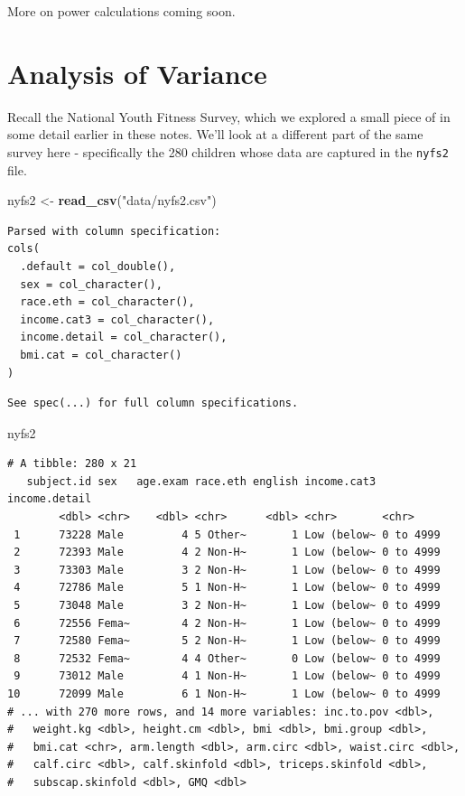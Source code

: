\documentclass[
]{book}
\newenvironment{Shaded}{\begin{snugshade}}{\end{snugshade}}
\newcommand{\KeywordTok}[1]{\textcolor[rgb]{0.13,0.29,0.53}{\textbf{#1}}}
\newcommand{\NormalTok}[1]{#1}
\newcommand{\StringTok}[1]{\textcolor[rgb]{0.31,0.60,0.02}{#1}}
\begin{document}
More on power calculations coming soon.

\hypertarget{analysis-of-variance}{%
\chapter{Analysis of Variance}\label{analysis-of-variance}}

Recall the National Youth Fitness Survey, which we explored a small piece of in some detail earlier in these notes. We'll look at a different part of the same survey here - specifically the 280 children whose data are captured in the \texttt{nyfs2} file.

\begin{Shaded}
\begin{Highlighting}[]
\NormalTok{nyfs2 <-}\StringTok{ }\KeywordTok{read_csv}\NormalTok{(}\StringTok{"data/nyfs2.csv"}\NormalTok{)}
\end{Highlighting}
\end{Shaded}

\begin{verbatim}
Parsed with column specification:
cols(
  .default = col_double(),
  sex = col_character(),
  race.eth = col_character(),
  income.cat3 = col_character(),
  income.detail = col_character(),
  bmi.cat = col_character()
)
\end{verbatim}

\begin{verbatim}
See spec(...) for full column specifications.
\end{verbatim}

\begin{Shaded}
\begin{Highlighting}[]
\NormalTok{nyfs2}
\end{Highlighting}
\end{Shaded}

\begin{verbatim}
# A tibble: 280 x 21
   subject.id sex   age.exam race.eth english income.cat3 income.detail
        <dbl> <chr>    <dbl> <chr>      <dbl> <chr>       <chr>        
 1      73228 Male         4 5 Other~       1 Low (below~ 0 to 4999    
 2      72393 Male         4 2 Non-H~       1 Low (below~ 0 to 4999    
 3      73303 Male         3 2 Non-H~       1 Low (below~ 0 to 4999    
 4      72786 Male         5 1 Non-H~       1 Low (below~ 0 to 4999    
 5      73048 Male         3 2 Non-H~       1 Low (below~ 0 to 4999    
 6      72556 Fema~        4 2 Non-H~       1 Low (below~ 0 to 4999    
 7      72580 Fema~        5 2 Non-H~       1 Low (below~ 0 to 4999    
 8      72532 Fema~        4 4 Other~       0 Low (below~ 0 to 4999    
 9      73012 Male         4 1 Non-H~       1 Low (below~ 0 to 4999    
10      72099 Male         6 1 Non-H~       1 Low (below~ 0 to 4999    
# ... with 270 more rows, and 14 more variables: inc.to.pov <dbl>,
#   weight.kg <dbl>, height.cm <dbl>, bmi <dbl>, bmi.group <dbl>,
#   bmi.cat <chr>, arm.length <dbl>, arm.circ <dbl>, waist.circ <dbl>,
#   calf.circ <dbl>, calf.skinfold <dbl>, triceps.skinfold <dbl>,
#   subscap.skinfold <dbl>, GMQ <dbl>
\end{verbatim}
\end{document}
